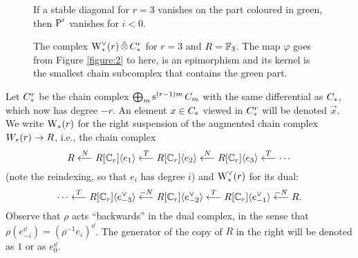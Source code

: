 \begin{figure}
	
	\caption{If a stable diagonal for $r=3$ vanishes on the part coloured in green, then $\power^i$ vanishes for $i<0$.}
	\label{figure:2}

	
	\caption{The complex $\rWd(r) \hotimes \rucadenas$ for $r=3$ and $R=\bF_3$.
		The map $\varphi$ goes from Figure \ref{figure:2} to here, is an epimorphism and its kernel is the smallest chain subcomplex that contains the green part.}
	\label{figure:3}
\end{figure}

Let $\rucadenas$ be the chain complex $\bigoplus_m \sus{(r-1)m}\ucadenas[m]$ with the same differential as $\ucadenas$, which now has degree $-r$.
An element $x\in \ucadenas$ viewed in $\rucadenas$ will be denoted $\vec{x}$.
We write $\rW(r)$ for the right suspension of the augmented chain complex $\W(r) \to R$, i.e., the chain complex
\[
R
\overset{N}{\lla}
R[\Cyc_r]\langle e_{1}\rangle
\overset{T}{\lla}
R[\Cyc_r]\langle e_{2}\rangle
\overset{N}{\lla}
R[\Cyc_r]\langle e_{3}\rangle
\overset{T}{\lla}
\dotsb
\]
(note the reindexing, so that $e_i$ has degree $i$) and $\rWd(r)$ for its dual:
\[
\dotsb
\overset{T}{\lla}
R[\Cyc_r]\langle e_{-3}^\dd\rangle
\overset{-N}{\lla}
R[\Cyc_r]\langle e_{-2}^\dd\rangle
\overset{T}{\lla}
R[\Cyc_r]\langle e_{-1}^\dd\rangle
\overset{-N}{\lla}
R.
\]
Observe that $\rho$ acts ``backwards'' in the dual complex, in the sense that $\rho (e_{-i}^\dd) = (\rho^{-1} e_i)^{\dd}$.
The generator of the copy of $R$ in the right will be denoted as $1$ or as $e_0^\dd$.

